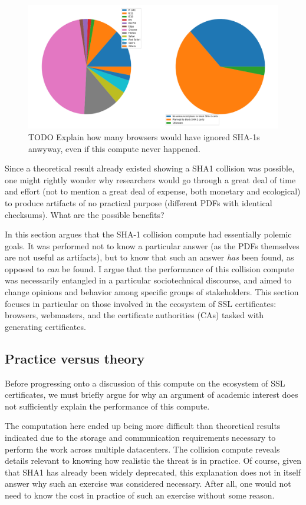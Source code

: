 \documentclass[sigconf]{acmart}
\begin{document}
\begin{figure}
\centering
\includegraphics[width=.9\linewidth]{./figures/browser-share.png}
\caption{TODO Explain how many browsers would have ignored SHA-1s anwyway, even if this compute never happened.}
\end{figure}

Since a theoretical result already existed showing a SHA1 collision was possible, 
one might rightly wonder why researchers would go through a great deal of time and effort
(not to mention a great deal of expense, both monetary and ecological)
to produce artifacts of no practical purpose (different PDFs with identical checksums).
What are the possible benefits?

In this section argues that
the SHA-1 collision compute had essentially polemic goals.
It was performed not to know a particular answer
(as the PDFs themselves are not useful as artifacts), 
but to know that such an answer \emph{has} been found,
as opposed to \emph{can} be found.
I argue that the performance of this collision compute
was necessarily entangled in a particular sociotechnical discourse,
and aimed to change opinions and behavior among specific groups of stakeholders.
This section focuses in particular on those involved in the ecosystem of SSL certificates: browsers, webmasters, and the certificate authorities (CAs) tasked with generating certificates.

\subsection{Practice versus theory}
\label{sec:orgba0955b}

Before progressing onto a discussion of this compute on the ecosystem of SSL certificates,
we must briefly argue for why an argument of academic interest does not sufficiently explain the performance of this compute.

The computation here ended up being more difficult than theoretical results indicated due to the storage and communication requirements necessary to perform the work across multiple datacenters. 
The collision compute reveals details relevant
to knowing how realistic the threat is in practice. 
Of course, given that SHA1 has already been widely deprecated, this explanation does not in itself answer why such an exercise was considered necessary.
After all, one would not need to know the cost in practice of such an exercise without some reason.
\end{document}
